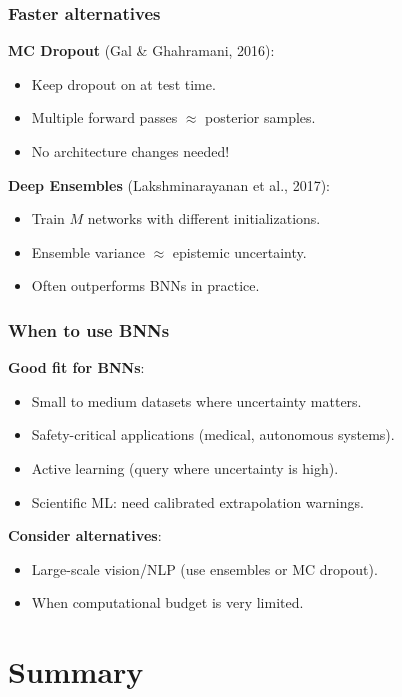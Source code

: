 \documentclass{beamer}
\begin{document}
\begin{frame}
\frametitle{Faster alternatives}
\textbf{MC Dropout} (Gal \& Ghahramani, 2016):
\begin{itemize}
    \item Keep dropout on at test time.
    \item Multiple forward passes $\approx$ posterior samples.
    \item No architecture changes needed!
\end{itemize}
\vspace{0.3cm}
\textbf{Deep Ensembles} (Lakshminarayanan et al., 2017):
\begin{itemize}
    \item Train $M$ networks with different initializations.
    \item Ensemble variance $\approx$ epistemic uncertainty.
    \item Often outperforms BNNs in practice.
\end{itemize}
\end{frame}

\begin{frame}
\frametitle{When to use BNNs}
\textbf{Good fit for BNNs}:
\begin{itemize}
    \item Small to medium datasets where uncertainty matters.
    \item Safety-critical applications (medical, autonomous systems).
    \item Active learning (query where uncertainty is high).
    \item Scientific ML: need calibrated extrapolation warnings.
\end{itemize}
\vspace{0.3cm}
\textbf{Consider alternatives}:
\begin{itemize}
    \item Large-scale vision/NLP (use ensembles or MC dropout).
    \item When computational budget is very limited.
\end{itemize}
\end{frame}

\section{Summary}
\end{document}

